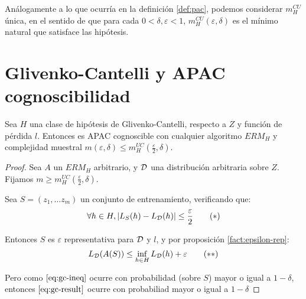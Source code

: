 Análogamente a lo que ocurría en la definición \ref{def:pac}, podemos considerar $m_H^{CU}$ única, en el sentido de
que para cada $0 < \delta, \varepsilon < 1$, $m_{H}^{CU}(\varepsilon, \delta)$ es el mínimo natural que satisface las 
hipótesis.

\section{Glivenko-Cantelli y APAC cognoscibilidad}

\begin{theorem}
Sea $H$ una clase de hipótesis de Glivenko-Cantelli, respecto a $Z$ y función de pérdida $l$. 
Entonces es APAC cognoscible con cualquier algoritmo $ERM_H$ y complejidad muestral
$m(\varepsilon, \delta) \le m_{H}^{UC} \left(\frac{\varepsilon}{2}, \delta \right)$. 
\label{th:gc-apac}
\end{theorem}

  \begin{proof}
   Sea $A$ un $ERM_H$ arbitrario, y $\mathcal{D}$ una distribución arbitraria sobre $Z$.
   Fijamos $m \ge m_{H}^{UC} \left(\frac{\varepsilon}{2}, \delta \right)$.

   Sea $S = (z_1, \ldots z_m)$ un conjunto de entrenamiento, verificando que: 
   \begin{equation}
     \forall h\in H, |L_{S}(h)-L_{\mathcal{D}}(h)| \le \frac{\varepsilon}{2}
     \label{eq:gc-ineq}\tag{$\ast$}
   \end{equation}

   Entonces $S$ es $\varepsilon$ representativa para $\mathcal{D}$ y $l$, y por proposición \ref{fact:epsilon-rep}:
   \begin{equation}
    L_{\mathcal{D}}(A(S)) \le \inf_{h\in H} L_{\mathcal{D}}(h) + \varepsilon
    \label{eq:gc-result}\tag{$\ast$$\ast$}
   \end{equation}

   Pero como $\eqref{eq:gc-ineq}$ ocurre con probabilidad (sobre $S$) mayor o igual a $1-\delta$, entonces 
   $\eqref{eq:gc-result}$ ocurre con probabiliad mayor o igual a $1-\delta$
  \end{proof}
  
